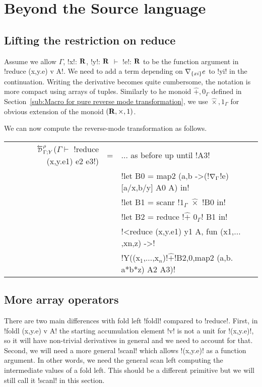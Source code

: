 \section{Beyond the Source language}
\label{sec:generalization}

\subsection{Lifting the restriction on reduce}
\label{sub:Lifting the restriction on reduce}

Assume we allow $\Gamma$, !x!: $\mathbf{R}$, !y!: $\mathbf{R}$ $\vdash$ !e!: $\mathbf{R}$ to be the function argument in
!reduce (x,y.e) v A!. We need to add a term depending on $\nabla_{\{xi\}}e$ to !yi! in the continuation.
Writing the derivative becomes quite cumbersome, the notation is more compact using arrays of tuples. 
Similarly to he monoid $\widehat{+},0_\Gamma$ defined in Section~\ref{sub:Macro for pure reverse mode transformation},
we use $\widehat{\times},1_\Gamma$ for obvious extension of the monoid $(\mathbf{R},\times,1)$.

We can now compute the reverse-mode transformation as follows.
\begin{center}
\begin{tabular}{r c l}
$\directD{\rho}{\Gamma}{Y}$($\Gamma\vdash $ !reduce (x,y.e1) e2 e3!) 
&=& $\ldots$ as before up until !A3! \\
&& !let B0 = map2 (a,b ->(!$\nabla_\Gamma$!e)[a/x,b/y] A0 A) in!\\
&& !let B1 = scanr !$1_\Gamma$ $\widehat{\times}$ !B0 in! \\
&& !let B2 = reduce !$\widehat{+}$ $0_\Gamma$! B1 in! \\
&& !<reduce (x,y.e1) y1 A, fun (x1,$\ldots$,xn,z) ->! \\
&& !Y((x$_1$,$\ldots$,x$_n$)!$\widehat{+}$!B2,0,map2 (a,b. a*b*z) A2 A3)!
\end{tabular}
\end{center}

\subsection{More array operators}
\label{sub:Adding more array operators}

There are two main differences with fold left !foldl! compared to !reduce!. 
First, in !foldl (x,y.e) v A! the starting accumulation element !v! is not a unit for !(x,y.e)!,
so it will have non-trivial derivatives in general and we need to account for that.
Second, we will need a more general !scanl! which allows !(x,y.e)! as a function argument. 
In other words, we need the general scan left computing the intermediate values of a fold left.
This should be a different primitive but we will still call it !scanl! in this section.

